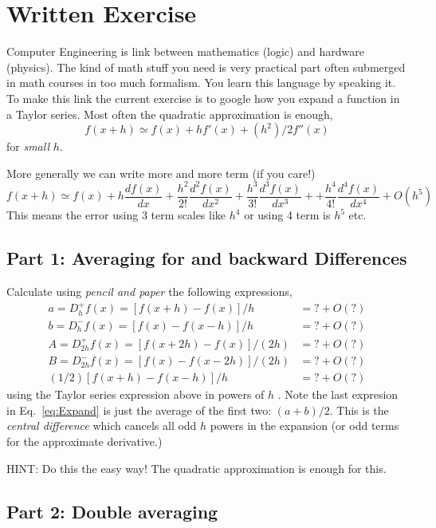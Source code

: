 \documentclass[pdftex,letterpaper,12pt]{article}
\newcommand{\nn}{\nonumber \\}
\newcommand{\<}{\langle}
\renewcommand{\>}{\rangle}
\begin{document}
\section{Written Exercise}

Computer Engineering is  link between mathematics (logic)  and
hardware (physics). The kind of math stuff you need is very practical part  often submerged
in math courses in too much formalism.   You learn this language by
speaking it.  To make this link the current
exercise is to  google  how you expand a   function in a Taylor series. Most
often the quadratic approximation is enough,
%
\begin{equation}
f(x + h) \simeq f(x) + hf'(x) + (h^2)/2 f''(x) 
\end{equation}
%
for {\em small} $h$.

More generally we can write more and more term (if you care!)
\begin{equation}
f(x + h) \simeq f(x) + h\frac{df(x)}{dx} + \frac{h^2}{2!}
\frac{d^2f(x)}{dx^2}  + \frac{h^3}{3!} 
\frac{d^3f(x)}{dx^3}  + + \frac{h^4}{4!} 
\frac{d^4f(x)}{dx^4}   + O(h^5) 
\end{equation}
 This means the error using 3 term scales like $h^4$ or using 4 term is $h^5$ etc.

\subsection{Part 1: Averaging for and backward Differences}

Calculate using {\em pencil and paper}  the following expressions,
\begin{align}
a = D^{+}_h f(x) =  [f(x+h) - f(x)]/h &= ? + O(?)  \nn
 b = D^{-}_h f(x) =  [f(x) - f(x-h)]/h &= ? + O(?) \nn
A = D^{+}_{2h}f(x)  = [f(x+2h) - f(x)]/(2h) &= ? + O(?) \nn
 B = D^{-}_{2h}f(x)  = [f(x) - f(x-2h)]/(2h) &= ? + O(?) \nn
(1/2) [f(x+h) - f(x-h)]/h &= ? + O(?)  
\label{eq:Expand}
\end{align}
%
 using the Taylor series expression above in powers of $h$
.
Note the last expresion in Eq.~\ref{eq:Expand} is just the average of the first two:
$(a+b)/2$.  This is the {\em central difference} which cancels all odd
$h$ powers in  the expansion (or odd terms for the approximate derivative.)

 HINT:  Do this the easy way! The quadratic approximation is enough for this.

\subsection{Part 2: Double averaging}
\end{document}
